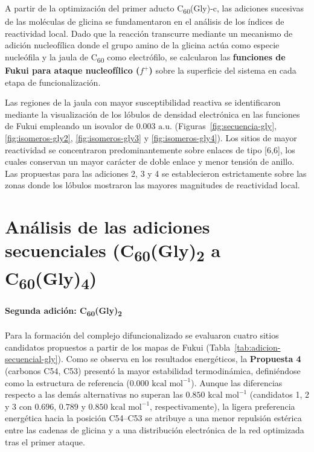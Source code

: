 A partir de la optimización del primer aducto C\textsubscript{60}(Gly)-c, las adiciones sucesivas de las moléculas de glicina se fundamentaron en el análisis de los índices de reactividad local. Dado que la reacción transcurre mediante un mecanismo de adición nucleofílica donde el grupo amino de la glicina actúa como especie nucleófila y la jaula de C\textsubscript{60} como electrófilo, se calcularon las \textbf{funciones de Fukui para ataque nucleofílico ($f^+$)} sobre la superficie del sistema en cada etapa de funcionalización.

Las regiones de la jaula con mayor susceptibilidad reactiva se identificaron mediante la visualización de los lóbulos de densidad electrónica en las funciones de Fukui empleando un isovalor de $0.003\text{ a.u.}$ (Figuras~\ref{fig:secuencia-gly}, \ref{fig:isomeros-gly2}, \ref{fig:isomeros-gly3} y \ref{fig:isomeros-gly4}). Los sitios de mayor reactividad se concentraron predominantemente sobre enlaces de tipo [6,6], los cuales conservan un mayor carácter de doble enlace y menor tensión de anillo. Las propuestas para las adiciones 2, 3 y 4 se establecieron estrictamente sobre las zonas donde los lóbulos mostraron las mayores magnitudes de reactividad local.

\section{Análisis de las adiciones secuenciales (C\textsubscript{60}(Gly)\textsubscript{2} a C\textsubscript{60}(Gly)\textsubscript{4})}

\paragraph{Segunda adición: C\textsubscript{60}(Gly)\textsubscript{2}}
Para la formación del complejo difuncionalizado se evaluaron cuatro sitios candidatos propuestos a partir de los mapas de Fukui (Tabla~\ref{tab:adicion-secuencial-gly}). Como se observa en los resultados energéticos, la \textbf{Propuesta 4} (carbonos C54, C53) presentó la mayor estabilidad termodinámica, definiéndose como la estructura de referencia ($0.000\text{ kcal mol}^{-1}$). Aunque las diferencias respecto a las demás alternativas no superan las $0.850\text{ kcal mol}^{-1}$ (candidatos 1, 2 y 3 con $0.696$, $0.789$ y $0.850\text{ kcal mol}^{-1}$, respectivamente), la ligera preferencia energética hacia la posición C54--C53 se atribuye a una menor repulsión estérica entre las cadenas de glicina y a una distribución electrónica de la red optimizada tras el primer ataque.

